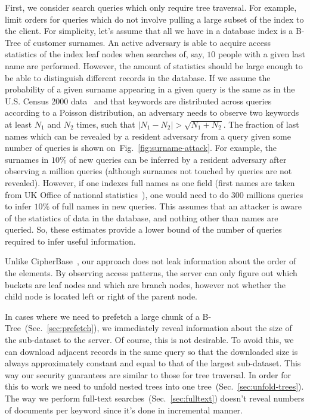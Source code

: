 \documentclass[notitlepage,longbibliography]{revtex4-1}
\newcommand{\figref}[1]{Fig.~\ref{#1}}
\begin{document}
First, we consider search queries which only require tree traversal.
For example, limit orders for queries which do not involve pulling a large subset of the index to the client.
For simplicity, let's assume that all we have in a database index is a B-Tree of customer surnames.
An active adversary is able to acquire access statistics of the index leaf nodes when searches of, say, $10$ people with a given last name are performed.
However, the amount of statistics should be large enough to be able to distinguish different records in the database.
If we assume the probability of a given surname appearing in a given query is the same as in the U.S. Census 2000 data~\cite{us-census-surnames}
and that keywords are distributed across queries according to a Poisson distribution,
an adversary needs to observe two keywords at least $N_1$ and $N_2$ times, such that $|N_1 - N_2| > \sqrt{N_1 + N_2}$.
The fraction of last names which can be revealed by a resident adversary from a query given some number of queries is shown on~\figref{fig:surname-attack}.
For example, the surnames in $10\%$ of new queries can be inferred by a resident adversary after observing a million queries (although surnames not touched by queries are not revealed).
However, if one indexes full names as one field (first names are taken from UK Office of national statistics~\cite{uk-first-names}),
one would need to do $300$ millions queries to infer $10\%$ of full names in new queries.
This assumes that an attacker is aware of the statistics of data in the database, and nothing other than names are queried.
So, these estimates provide a lower bound of the number of queries required to infer useful information.

Unlike CipherBase~\cite{cipherbase}, our approach does not leak information about the order of the elements.
By observing access patterns, the server can only figure out which buckets are leaf nodes and which are branch nodes,
however not whether the child node is located left or right of the parent node.

In cases where we need to prefetch a large chunk of a B-Tree~(Sec.~\ref{sec:prefetch}), we immediately reveal information about the size of the sub-dataset to the server.
Of course, this is not desirable.
To avoid this, we can download adjacent records in the same query so that the downloaded size is always approximately constant and equal to that of the largest sub-dataset.
This way our security guarantees are similar to those for tree traversal.
In order for this to work we need to unfold nested trees into one tree~(Sec.~\ref{sec:unfold-trees}).
The way we perform full-text searches~(Sec.~\ref{sec:fulltext}) doesn't reveal numbers of documents per keyword since it's done in incremental manner.
\end{document}
